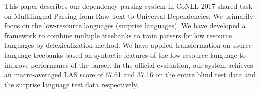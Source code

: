 This paper describes our dependency parsing system in CoNLL-2017 shared task on Multilingual Parsing from Raw Text to Universal Dependencies. We primarily focus on the low-resource languages (surprise languages). We have developed a framework to combine multiple treebanks to train parsers for low resource languages by delexicalization method. We have applied transformation on source language treebanks based on syntactic features of the low-resource language to improve performance of the parser. In the official evaluation, our system achieves an macro-averaged LAS score of 67.61 and 37.16 on the entire blind test data and the surprise language test data respectively.
